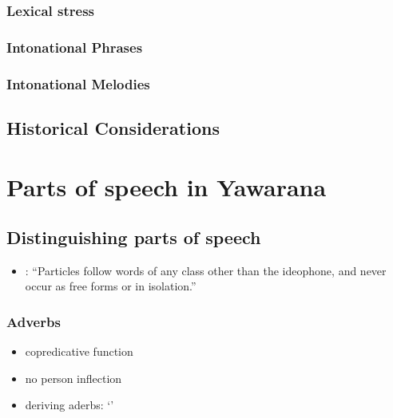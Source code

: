 \documentclass{memoir}
\begin{document}
\subsection{\texorpdfstring{Lexical stress
\label{sec:stress}}{Lexical stress }}

\subsection{\texorpdfstring{Intonational Phrases
\label{sec:intphrases}}{Intonational Phrases }}

\subsection{\texorpdfstring{Intonational Melodies
\label{sec:intmelodies}}{Intonational Melodies }}

\section{\texorpdfstring{Historical Considerations
\label{sec:histphono}}{Historical Considerations }}

\chapter{\texorpdfstring{Parts of speech in Yawarana
\label{POS}}{Parts of speech in Yawarana }}

\section{Distinguishing parts of speech}

\begin{itemize}
\tightlist
\item
  \textcites[111]{koehn1986apalai}: ``Particles follow words of any
  class other than the ideophone, and never occur as free forms or in
  isolation.''
\end{itemize}

\subsection{Adverbs}

\begin{itemize}
\tightlist
\item
  copredicative function
\item
  no person inflection
\item
  deriving aderbs:  `'
\end{itemize}
\end{document}
